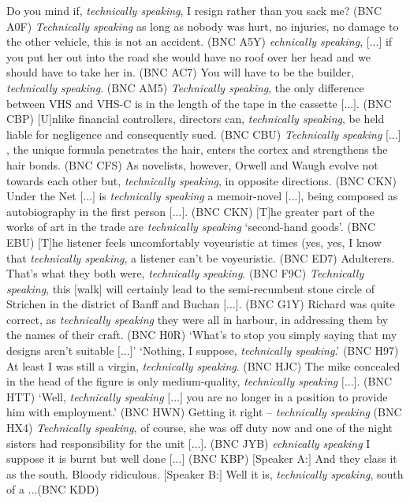 \begin{exe}
\ex
\begin{xlist}
\label{ex:technicallyspeaking}
\ex Do you mind if, \textit{technically speaking}, I resign rather than you sack me? (BNC A0F) %
\ex \textit{Technically speaking} as long as nobody was hurt, no injuries, no damage to the other vehicle, this is not an accident. (BNC A5Y) %
\ex\relax [\textit{T}]\textit{echnically speaking}, $[$...$]$ if you put her out into the road she would have no roof over her head and we should have to take her in. (BNC AC7) %
\ex You will have to be the builder, \textit{technically speaking}. (BNC AM5) %
\ex \textit{Technically speaking}, the only difference between VHS and VHS-C is in the length of the tape in the cassette $[$...$]$. (BNC CBP) %
\ex $[$U$]$nlike financial controllers, directors can, \textit{technically speaking}, be held liable for negligence and consequently sued. (BNC CBU) %
\ex \textit{Technically speaking} $[$...$]$, the unique formula penetrates the hair, enters the cortex and strengthens the hair bonds. (BNC CFS) %
\ex As novelists, however, Orwell and Waugh evolve not towards each other but, \textit{technically speaking}, in opposite directions. (BNC CKN) %
\ex Under the Net $[$...$]$ is \textit{technically speaking} a memoir-novel $[$...$]$, being composed as autobiography in the first person $[$...$]$. (BNC CKN) %
\ex $[$T$]$he greater part of the works of art in the trade are \textit{technically speaking} `second-hand goods'. (BNC EBU) %
\ex $[$T$]$he listener feels uncomfortably voyeuristic at times (yes, yes, I know that \textit{technically speaking}, a listener can't be voyeuristic. (BNC ED7) %
\ex Adulterers. That's what they both were, \textit{technically speaking}. (BNC F9C) %
\ex \textit{Technically speaking}, this $[$walk$]$ will certainly lead to the semi\hyp{}recumbent stone circle of Strichen in the district of Banff and Buchan $[$...$]$. (BNC G1Y) %
\ex Richard was quite correct, as \textit{technically speaking} they were all in harbour, in addressing them by the names of their craft. (BNC H0R) %
\ex `What's to stop you simply saying that my designs aren't suitable $[$...$]$' `Nothing, I suppose, \textit{technically speaking}.' (BNC H97) %
\ex At least I was still a virgin, \textit{technically speaking}. (BNC HJC) %
\ex The mike concealed in the head of the figure is only medium-quality, \textit{technically speaking} $[$...$]$. (BNC HTT) %
\ex `Well, \textit{technically speaking} $[$...$]$ you are no longer in a position to provide him with employment.' (BNC HWN) %
\ex Getting it right -- \textit{technically speaking} (BNC HX4) %
\ex \textit{Technically speaking}, of course, she was off duty now and one of the night sisters had responsibility for the unit $[$...$]$. (BNC JYB) %
\ex\relax [\textit{T}]\textit{echnically speaking} I suppose it is burnt but well done $[$...$]$ (BNC KBP) %
\ex $[$Speaker A:$]$ And they class it as the south. Bloody ridiculous. $[$Speaker B:$]$ Well it is, \textit{technically speaking}, south of a ...(BNC KDD) %
\end{xlist}
\end{exe}

